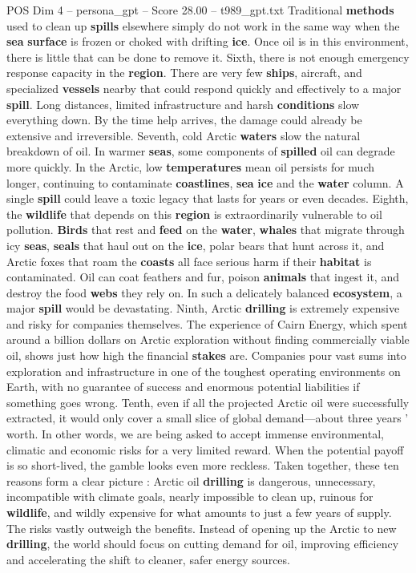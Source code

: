 \begin{textsample}{POS Dim 4 – persona\_gpt – Score 28.00 – t989\_gpt.txt}
Traditional \textbf{methods} used to clean up \textbf{spills} elsewhere simply do not work in the same way when the \textbf{sea} \textbf{surface} is frozen or choked with drifting \textbf{ice}.
Once oil is in this environment, there is little that can be done to remove it.
Sixth, there is not enough emergency response capacity in the \textbf{region}.
There are very few \textbf{ships}, aircraft, and specialized \textbf{vessels} nearby that could respond quickly and effectively to a major \textbf{spill}.
Long distances, limited infrastructure and harsh \textbf{conditions} slow everything down.
By the time help arrives, the damage could already be extensive and irreversible.
Seventh, cold Arctic \textbf{waters} slow the natural breakdown of oil.
In warmer \textbf{seas}, some components of \textbf{spilled} oil can degrade more quickly.
In the Arctic, low \textbf{temperatures} mean oil persists for much longer, continuing to contaminate \textbf{coastlines}, \textbf{sea} \textbf{ice} and the \textbf{water} column.
A single \textbf{spill} could leave a toxic legacy that lasts for years or even decades.
Eighth, the \textbf{wildlife} that depends on this \textbf{region} is extraordinarily vulnerable to oil pollution. \textbf{Birds} that rest and \textbf{feed} on the \textbf{water}, \textbf{whales} that migrate through icy \textbf{seas}, \textbf{seals} that haul out on the \textbf{ice}, polar bears that hunt across it, and Arctic foxes that roam the \textbf{coasts} all face serious harm if their \textbf{habitat} is contaminated.
Oil can coat feathers and fur, poison \textbf{animals} that ingest it, and destroy the food \textbf{webs} they rely on.
In such a delicately balanced \textbf{ecosystem}, a major \textbf{spill} would be devastating.
Ninth, Arctic \textbf{drilling} is extremely expensive and risky for companies themselves.
The experience of Cairn Energy, which spent around a billion dollars on Arctic exploration without finding commercially viable oil, shows just how high the financial \textbf{stakes} are.
Companies pour vast sums into exploration and infrastructure in one of the toughest operating environments on Earth, with no guarantee of success and enormous potential liabilities if something goes wrong.
Tenth, even if all the projected Arctic oil were successfully extracted, it would only cover a small slice of global demand—about three years ’ worth.
In other words, we are being asked to accept immense environmental, climatic and economic risks for a very limited reward.
When the potential payoff is so short-lived, the gamble looks even more reckless.
Taken together, these ten reasons form a clear picture : Arctic oil \textbf{drilling} is dangerous, unnecessary, incompatible with climate goals, nearly impossible to clean up, ruinous for \textbf{wildlife}, and wildly expensive for what amounts to just a few years of supply.
The risks vastly outweigh the benefits.
Instead of opening up the Arctic to new \textbf{drilling}, the world should focus on cutting demand for oil, improving efficiency and accelerating the shift to cleaner, safer energy sources.


\end{textsample}
